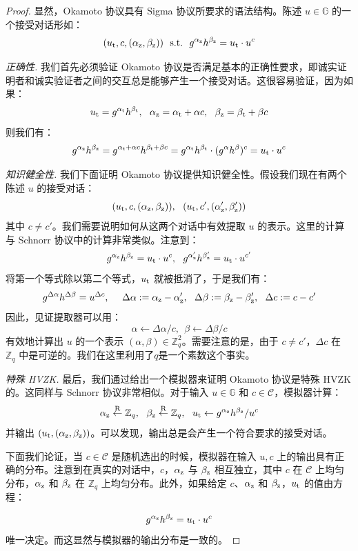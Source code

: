 \begin{proof}
显然，Okamoto 协议具有 Sigma 协议所要求的语法结构。陈述 $u\in\mathbb{G}$ 的一个接受对话形如：
$$
(u_{\rm t},c,(\alpha_{\rm z},\beta_{\rm z})) \text{~~s.t.~~} g^{\alpha_{\rm z}}h^{\beta_{\rm z}}=u_{\rm t}\cdot u^c
$$

\noindent
\emph{正确性.}
我们首先必须验证 Okamoto 协议是否满足基本的正确性要求，即诚实证明者和诚实验证者之间的交互总是能够产生一个接受对话。这很容易验证，因为如果：
$$
u_{\rm t}=g^{\alpha_{\rm t}}h^{\beta_{\rm t}},~~
\alpha_{\rm z}=\alpha_{\rm t}+\alpha c,~~
\beta_{\rm z}=\beta_{\rm t}+\beta c
$$
则我们有：
$$
g^{\alpha_{\rm z}}h^{\beta_{\rm z}}=
g^{\alpha_{\rm t}+\alpha c}h^{\beta_{\rm t}+\beta c}=
g^{\alpha_{\rm t}}h^{\beta_{\rm t}}\cdot(g^\alpha h^\beta)^c=
u_{\rm t}\cdot u^c
$$

\noindent
\emph{知识健全性.}
我们下面证明 Okamoto 协议提供知识健全性。假设我们现在有两个陈述 $u$ 的接受对话：
$$
(u_{\rm t},c,(\alpha_{\rm z},\beta_{\rm z})),~~
(u_{\rm t},c',(\alpha_{\rm z}',\beta_{\rm z}'))
$$
其中 $c\neq c'$。我们需要说明如何从这两个对话中有效提取 $u$ 的表示。这里的计算与 Schnorr 协议中的计算非常类似。注意到：
$$
g^{\alpha_{\rm z}}h^{\beta_{\rm z}}=u_{\rm t}\cdot u^c,~~
g^{\alpha_{\rm z}'}h^{\beta_{\rm z}'}=u_{\rm t}\cdot u^{c'}
$$
将第一个等式除以第二个等式，$u_{\rm t}$ 就被抵消了，于是我们有：
$$
g^{\Delta\alpha}h^{\Delta\beta}=u^{\Delta c},~~~~
\Delta\alpha:=\alpha_{\rm z}-\alpha_{\rm z}',~~
\Delta\beta:=\beta_{\rm z}-\beta_{\rm z}',~~
\Delta c:=c-c'
$$
因此，见证提取器可以用：
$$
\alpha\leftarrow{\Delta\alpha}/{c},~~
\beta\leftarrow{\Delta\beta}/{c}
$$
有效地计算出 $u$ 的一个表示 $(\alpha,\beta)\in\mathbb{Z}_q^2$。需要注意的是，由于 $c\neq c'$，$\Delta c$ 在 $\mathbb{Z}_q$ 中是可逆的。我们在这里利用了$q$是一个素数这个事实。

\vspace{5pt}

\noindent
\emph{特殊 HVZK.}
最后，我们通过给出一个模拟器来证明 Okamoto 协议是特殊 HVZK 的。这同样与 Schnorr 协议非常相似。对于输入 $u\in\mathbb{G}$ 和 $c\in\mathcal{C}$，模拟器计算：
$$
\alpha_{\rm z}\overset{\rm R}\leftarrow\mathbb{Z}_q,~~
\beta_{\rm z}\overset{\rm R}\leftarrow\mathbb{Z}_q,~~
u_{\rm t}\leftarrow{g^{\alpha_{\rm z}}h^{\beta_{\rm z}}}/{u^c}
$$
并输出 $(u_{\rm t},(\alpha_{\rm z},\beta_{\rm z}))$。可以发现，输出总是会产生一个符合要求的接受对话。

下面我们论证，当 $c\in\mathcal{C}$ 是随机选出的时候，模拟器在输入 $u,c$ 上的输出具有正确的分布。注意到在真实的对话中，$c$，$\alpha_{\rm z}$ 与 $\beta_{\rm z}$ 相互独立，其中 $c$ 在 $\mathcal{C}$ 上均匀分布，$\alpha_{\rm z}$ 和 $\beta_{\rm z}$ 在 $\mathbb{Z}_q$ 上均匀分布。此外，如果给定 $c$、$\alpha_{\rm z}$ 和 $\beta_{\rm z}$，$u_{\rm t}$ 的值由方程：

$$
g^{\alpha_{\rm z}}h^{\beta_{\rm z}}=u_{\rm t}\cdot u^c
$$
唯一决定。而这显然与模拟器的输出分布是一致的。
\end{proof}

